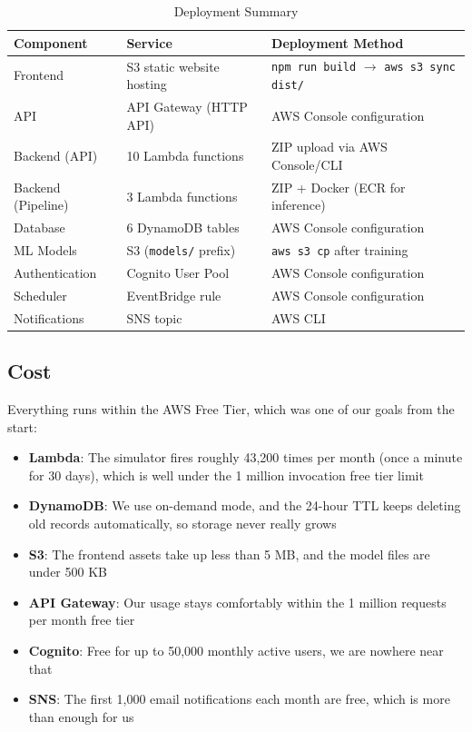 \documentclass[11pt,a4paper]{article}
\begin{document}
\begin{table}[H]
\centering
\begin{tabular}{lll}
\toprule
\textbf{Component} & \textbf{Service} & \textbf{Deployment Method} \\
\midrule
Frontend & S3 static website hosting & \texttt{npm run build} $\rightarrow$ \texttt{aws s3 sync dist/} \\
API & API Gateway (HTTP API) & AWS Console configuration \\
Backend (API) & 10 Lambda functions & ZIP upload via AWS Console/CLI \\
Backend (Pipeline) & 3 Lambda functions & ZIP + Docker (ECR for inference) \\
Database & 6 DynamoDB tables & AWS Console configuration \\
ML Models & S3 (\texttt{models/} prefix) & \texttt{aws s3 cp} after training \\
Authentication & Cognito User Pool & AWS Console configuration \\
Scheduler & EventBridge rule & AWS Console configuration \\
Notifications & SNS topic & AWS CLI \\
\bottomrule
\end{tabular}
\caption{Deployment Summary}
\label{tab:deployment}
\end{table}

\subsection{Cost}

Everything runs within the AWS Free Tier, which was one of our goals from the start:

\begin{itemize}[leftmargin=2em]
    \item \textbf{Lambda}: The simulator fires roughly 43,200 times per month (once a minute for 30 days), which is well under the 1 million invocation free tier limit
    \item \textbf{DynamoDB}: We use on-demand mode, and the 24-hour TTL keeps deleting old records automatically, so storage never really grows
    \item \textbf{S3}: The frontend assets take up less than 5 MB, and the model files are under 500 KB
    \item \textbf{API Gateway}: Our usage stays comfortably within the 1 million requests per month free tier
    \item \textbf{Cognito}: Free for up to 50,000 monthly active users, we are nowhere near that
    \item \textbf{SNS}: The first 1,000 email notifications each month are free, which is more than enough for us
\end{itemize}
\end{document}
